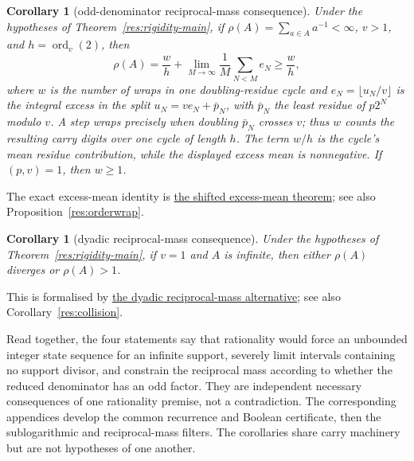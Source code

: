 \documentclass[11pt]{article}
\newcommand{\commit}{312b96c0d149ed466725c62d4ef24cfc91bca34e}
\newcommand{\repobase}{https://github.com/wcook04/plectis-lean-erdos249-257/blob/\commit}
\newcommand{\PK}{Erdos249257}
\newcommand{\lword}[4]{\href{\repobase/\PK/#1\#L#2}{#4}}
\newtheorem{corollary}[theorem]{Corollary}
\theoremstyle{definition}
\theoremstyle{remark}
\begin{document}
\begin{corollary}[odd-denominator reciprocal-mass consequence]
\label{res:rigidity-mass-main}
Under the hypotheses of Theorem~\ref{res:rigidity-main}, if
\(\rho(A)=\sum_{a\in A}a^{-1}<\infty\), \(v>1\), and
\(h=\operatorname{ord}_v(2)\), then
\[
 \rho(A)=\frac{w}{h}
   +\lim_{M\to\infty}\frac1M\sum_{N<M}e_N\geq\frac{w}{h},
\]
where \(w\) is the number of wraps in one doubling-residue cycle and
\(e_N=\lfloor u_N/v\rfloor\) is the integral excess in the split
\(u_N=ve_N+\bar p_N\), with \(\bar p_N\) the least residue of
\(p2^N\) modulo \(v\).  A step wraps precisely when doubling
\(\bar p_N\) crosses \(v\); thus \(w\) counts the resulting carry digits
over one cycle of length \(h\).  The term \(w/h\) is the cycle's mean
residue contribution, while the displayed excess mean is nonnegative.  If
\((p,v)=1\), then \(w\geq1\).
\end{corollary}
\noindent The exact excess-mean identity is
\lword{RationalSupportCarrySkeleton.lean}{1577}{exists_shifted_oddTailExcess_mean_of_support_fraction}{the shifted excess-mean theorem};
see also Proposition~\ref{res:orderwrap}.

\begin{corollary}[dyadic reciprocal-mass consequence]
\label{res:rigidity-dyadic-mass-main}
Under the hypotheses of Theorem~\ref{res:rigidity-main}, if \(v=1\) and
\(A\) is infinite, then either \(\rho(A)\) diverges or \(\rho(A)>1\).
\end{corollary}
\noindent This is formalised by
\lword{RationalSupportCarrySkeleton.lean}{2200}{dyadic_support_fraction_reciprocalMass_diverges_or_gt_one}{the dyadic reciprocal-mass alternative};
see also Corollary~\ref{res:collision}.

Read together, the four statements say that rationality would force an
unbounded integer state sequence for an infinite support, severely limit
intervals containing no support divisor, and constrain the reciprocal mass
according to whether the reduced denominator has an odd factor.  They are
independent necessary consequences of one rationality premise, not a
contradiction.
The corresponding appendices develop the common recurrence and Boolean
certificate, then the sublogarithmic and reciprocal-mass filters.  The
corollaries share carry machinery but are not hypotheses of one another.
\end{document}

